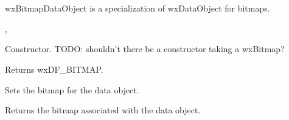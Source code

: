 \section{}\label{wxbitmapdataobject}

 wxBitmapDataObject is a specialization of wxDataObject for bitmaps.




, 


\label{wxbitmapdataobjectwxbitmapdataobject}


Constructor. TODO: shouldn't there be a constructor taking a wxBitmap?

\label{wxbitmapdataobjectgetformat}


Returns wxDF\_BITMAP.

\label{wxbitmapdataobjectsetbitmap}


Sets the bitmap for the data object.

\label{wxbitmapdataobjectgetbitmap}


Returns the bitmap associated with the data object.

